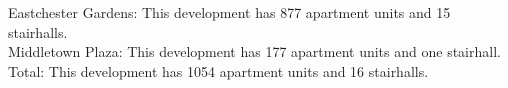 {Eastchester Gardens}: This development has 877 apartment units and 15 stairhalls.\\{Middletown Plaza}: This development has 177 apartment units and one stairhall.\\{Total}: This development has 1054 apartment units and 16 stairhalls.\\